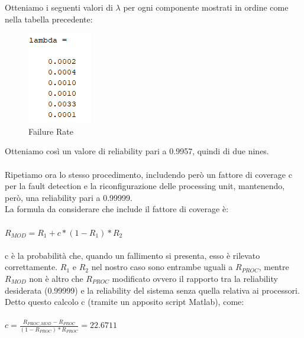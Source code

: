 	Otteniamo i seguenti valori di $\lambda$ per ogni componente mostrati in ordine come nella tabella precedente:
	
	\begin{figure}[H]
		\centering
		\includegraphics[scale=0.9]{./immagine/lambda_es5.png}
		\caption{Failure Rate}
		\label{fig:lambda_es5}
	\end{figure}
	
	Otteniamo così un valore di reliability pari a 0.9957, quindi di due nines.\\\\
	Ripetiamo ora lo stesso procedimento, includendo però un fattore di coverage c per la fault detection e la riconfigurazione delle processing unit, mantenendo, però, una reliability pari a 0.99999.\\
	La formula da considerare che include il fattore di coverage è:\\\\
	$ R_{MOD}=R_{1}+c*(1-R_{1})*R_{2} $\\\\
	c è la probabilità che, quando un fallimento si presenta, esso è rilevato correttamente. $R_{1}$ e $R_{2}$ nel nostro caso sono entrambe uguali a $R_{PROC}$, mentre $R_{MOD}$ non è altro che $R_{PROC}$ modificato ovvero il rapporto tra la reliability desiderata (0.99999) e la reliability del sistema senza quella relativa ai processori.\\
	Detto questo calcolo c (tramite un apposito script Matlab), come:\\\\
	$ c=\frac{R_{PROC\_MOD}-R_{PROC}}{(1-R_{PROC})*R_{PROC}}=22.6711$